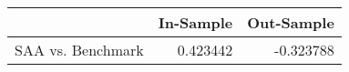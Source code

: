 \begin{tabular}{lrr}
\toprule
{} &  In-Sample &  Out-Sample \\
\midrule
SAA vs. Benchmark &   0.423442 &   -0.323788 \\
\bottomrule
\end{tabular}
